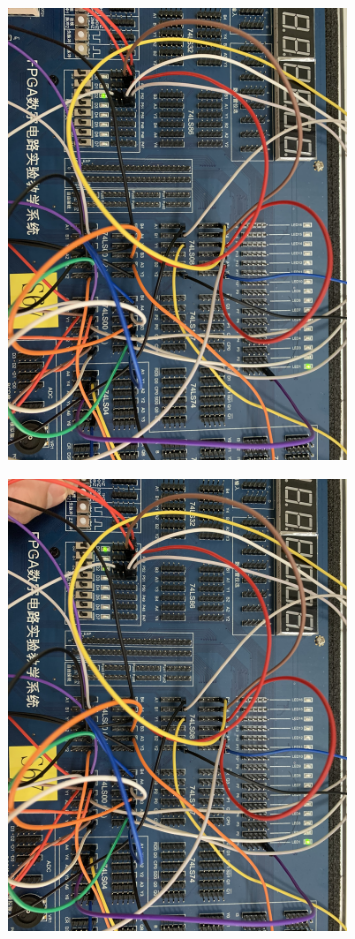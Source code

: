 \documentclass[UTF8, a4paper, 11pt]{article}
\begin{document}
\begin{figure}[H]
    \centering
    \includegraphics[width=0.8\textwidth]{0100.JPG}
\end{figure}
\begin{figure}[H]
    \centering
    \includegraphics[width=0.8\textwidth]{0101.JPG}
\end{figure}
\end{document}
